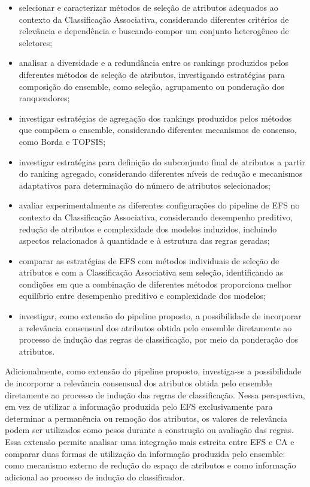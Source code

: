 \begin{itemize}

    \item selecionar e caracterizar métodos de seleção de atributos
    adequados ao contexto da Classificação Associativa, considerando
    diferentes critérios de relevância e dependência e buscando compor
    um conjunto heterogêneo de seletores;

    \item analisar a diversidade e a redundância entre os rankings
    produzidos pelos diferentes métodos de seleção de atributos,
    investigando estratégias para composição do ensemble, como seleção,
    agrupamento ou ponderação dos ranqueadores;

    \item investigar estratégias de agregação dos rankings produzidos
    pelos métodos que compõem o ensemble, considerando diferentes
    mecanismos de consenso, como Borda e TOPSIS;

    \item investigar estratégias para definição do subconjunto final de
    atributos a partir do ranking agregado, considerando diferentes
    níveis de redução e mecanismos adaptativos para determinação do
    número de atributos selecionados;

    \item avaliar experimentalmente as diferentes configurações do
    pipeline de EFS no contexto da Classificação Associativa,
    considerando desempenho preditivo, redução de atributos e
    complexidade dos modelos induzidos, incluindo aspectos relacionados
    à quantidade e à estrutura das regras geradas;

    \item comparar as estratégias de EFS com métodos individuais de
    seleção de atributos e com a Classificação Associativa sem seleção,
    identificando as condições em que a combinação de diferentes métodos
    proporciona melhor equilíbrio entre desempenho preditivo e
    complexidade dos modelos;

    \item investigar, como extensão do pipeline proposto, a possibilidade
    de incorporar a relevância consensual dos atributos obtida pelo
    ensemble diretamente ao processo de indução das regras de
    classificação, por meio da ponderação dos atributos.

\end{itemize}
Adicionalmente, como extensão do pipeline proposto, investiga-se a possibilidade de incorporar a relevância consensual dos atributos obtida pelo ensemble diretamente ao processo de indução das regras de classificação. Nessa perspectiva, em vez de utilizar a informação produzida pelo EFS exclusivamente para determinar a permanência ou remoção dos atributos, os valores de relevância podem ser utilizados como pesos durante a construção ou avaliação das regras. Essa extensão permite analisar uma integração mais estreita entre EFS e CA e comparar duas formas de utilização da informação produzida pelo ensemble: como mecanismo externo de redução do espaço de atributos e como informação adicional ao processo de indução do classificador.

